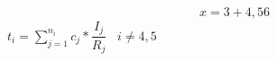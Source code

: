 \documentclass[10pt,a4paper]{article}
\author{test}
\begin{document}
	\begin{eqnarray}
	x=3+4, 56
	\end{eqnarray}
	$\displaystyle{ t_i = \sum_{j=1}^{n_i} c_j*\dfrac{I_j}{R_j}} \; \; \; i \neq 4, 5$
\end{document}
